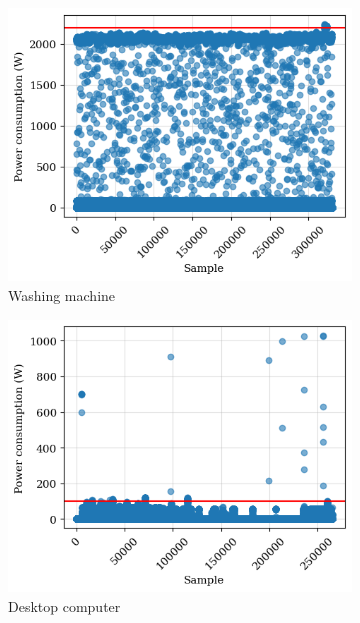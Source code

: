 \begin{figure}\ContinuedFloat
    \begin{subfigure}{.5\textwidth}
      \centering
      \includegraphics[width=.9\linewidth]{images/raw_consumptions/washing_machine.png}
      \caption{Washing machine}
      \label{fig:washing_machine}
    \end{subfigure}%
    \begin{subfigure}{.5\textwidth}
      \centering
      \includegraphics[width=.9\linewidth]{images/raw_consumptions/desktop_computer.png}
      \caption{Desktop computer}
      \label{fig:desktop_computer}
    \end{subfigure}
    \begin{subfigure}{.5\textwidth}
      \centering

\end{subfigure}
\end{figure}
